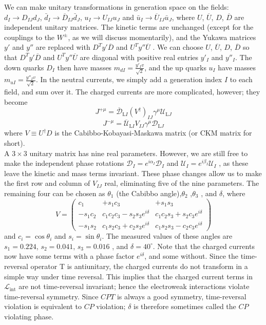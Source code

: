 We can make unitary transformations in generation space on the fields: $d_I \to D_{IJ}d_J $, $\bar{d}_I \to \overline{D}_{IJ}\bar{d}_J$, $u_I \to U_{IJ}u_J $ and $\bar{u}_I \to \overline{U}_{IJ}\bar{u}_J$, where $U$, $\overline{U}$, $D$, $\overline{D}$ are independent unitary matrices. 
The kinetic terms are unchanged (except for the couplings to the $W^{\pm}$, as we will discuss momentarily), and the Yukawa matrices $y'$ and $y''$ are replaced with $D^T y' \overline{D}$  and $U^T y'' \overline{U}$ . We can choose
$U$, $\overline{U}$, $D$, $\overline{D}$ so that $D^T y' \overline{D}$  and $U^T y'' \overline{U}$ are diagonal with positive real entries $y'_I$ and $y''_I$. The down quarks $D_I$ then have masses $m_{dI} = \frac{y'_I v}{\sqrt{2}}$,
and the up quarks $u_I$ have masses $m_{uI} = \frac{y''_I v}{\sqrt{2}}$. In the neutral currents, we simply add a generation index $I$ to each field, and sum over it. 
The charged currents are more complicated, however; they become 
\[J^{+\mu} = \overline{\mathcal{D}}_{\mathrm{L}I} (V^{\dagger})_{IJ} \gamma^{\mu} \mathcal{U}_{\mathrm{L}J}\]
\[J^{-\mu} = \overline{\mathcal{U}}_{\mathrm{L}I} V_{IJ} \gamma^{\mu} \mathcal{D}_{\mathrm{L}J}\]
where $V \equiv U^{\dagger} D$ is the Cabibbo-Kobayasi-Maskawa matrix (or CKM matrix for short).
\\
A $3 \times 3$ unitary matrix has nine real parameters. However, we are still free to make the independent phase rotations $\mathcal{D}_I = e^{i\alpha_I} \mathcal{D}_I$ and $\mathcal{U}_I = e^{i\beta_I} \mathcal{U}_I$ , as
these leave the kinetic and mass terms invariant. These phase changes allow us to make the first row and column of $V_{IJ}$ real, eliminating five of the nine parameters. The remaining four can be chosen as $\theta_1$ (the Cabibbo angle),$\theta_2$ ,$\theta_3$ , and $\delta$, where
\[V = \begin{pmatrix}
c_1 & +s_1c_3 & +s_1s_3 \\
-s_1c_2 & c_1c_2c_3 - s_2s_3e^{i\delta} & c_1c_2s_3 + s_2c_3e^{i\delta} \\
-s_1s_2 & c_1s_2c_3 + c_2s_3e^{i\delta} & c_1s_2s_3- c_2c_3 e^{i\delta}
\end{pmatrix} \]
and $c_i = \cos\theta_i$ and $s_i = \sin\theta_i$. The measured values of these angles are $s_1=0.224$, $s_2 = 0.041$, $s_3 = 0.016$ , and $\delta = 40^{\circ}$. Note that the charged currents now have some terms with a phase factor $e^{i\delta}$, and some without. 
Since the time-reversal operator T is antiunitary, the charged currents do not transform in a simple way under time reversal. This implies that the charged current terms in $\mathcal{L}_{\mathrm{int}}$ are not time-reversal invariant; hence the electroweak interactions violate time-reversal symmetry.
Since $CPT$ is always a good symmetry, time-reversal violation is equivalent to $CP$ violation; $\delta$ is therefore sometimes called the $CP$ violating phase.